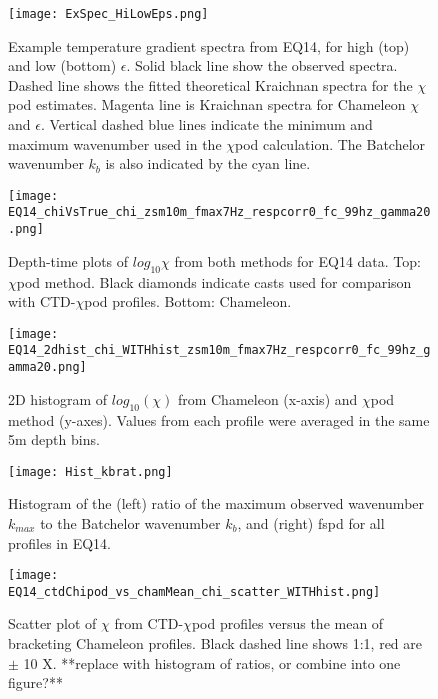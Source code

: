 \documentclass{ametsoc}
\begin{document}
\begin{figure}[t]
  \noindent\texttt{[image: ExSpec\_HiLowEps.png]}\\
  \caption{Example temperature gradient spectra from EQ14, for high (top) and low (bottom) $\epsilon$. Solid black line show the observed spectra. Dashed line shows the fitted theoretical Kraichnan spectra for the $\chi$pod estimates. Magenta line is Kraichnan spectra for Chameleon $\chi$ and $\epsilon$. Vertical dashed blue lines indicate the minimum and maximum wavenumber used in the $\chi$pod calculation. The Batchelor wavenumber $k_b$ is also indicated by the cyan line.}
  \label{specexamp}
\end{figure}


\begin{figure}[t]
  \noindent\texttt{[image: EQ14\_chiVsTrue\_chi\_zsm10m\_fmax7Hz\_respcorr0\_fc\_99hz\_gamma20.png]}\\
  \caption{Depth-time plots of $log_{10}\chi$ from both methods for EQ14 data. Top: $\chi$pod method. Black diamonds indicate casts used for comparison with CTD-$\chi$pod profiles. Bottom: Chameleon.}
  \label{eq14_eps_pcolor}
\end{figure}


\begin{figure}[t]
  \noindent\texttt{[image: EQ14\_2dhist\_chi\_WITHhist\_zsm10m\_fmax7Hz\_respcorr0\_fc\_99hz\_gamma20.png]}\\
  \caption{2D histogram of $log_{10}(\chi)$ from Chameleon (x-axis) and $\chi$pod method (y-axes). Values from each profile were averaged in the same 5m depth bins. }
  \label{eq14_chi_2dhist}
\end{figure}


\begin{figure}[t]
  \noindent\texttt{[image: Hist\_kbrat.png]}\\
  \caption{Histogram of the (left) ratio of the maximum observed wavenumber $k_{max}$ to the Batchelor wavenumber $k_b$, and (right) fspd for all profiles in EQ14. }
  \label{histkbrat}
\end{figure}

\begin{figure}[t]
  \noindent\texttt{[image: EQ14\_ctdChipod\_vs\_chamMean\_chi\_scatter\_WITHhist.png]}\\
  \caption{Scatter plot of $\chi$ from CTD-$\chi$pod profiles versus the mean of bracketing Chameleon profiles. Black dashed line shows 1:1, red are $\pm$ 10 X. **replace with histogram of ratios, or combine into one figure?**}
  \label{eq14_cdtChi_vs_cham}
\end{figure}
\end{document}
